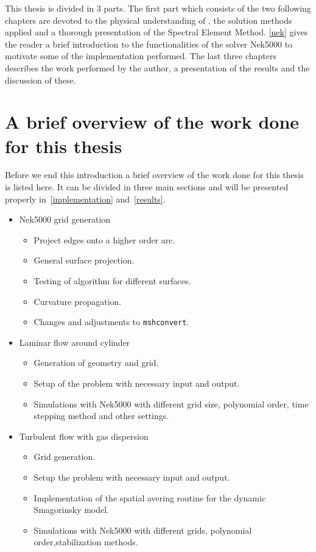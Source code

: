 This thesis is divided in 3 parts. The first part which consists of the two following chapters are devoted to the physical understanding 
of , the solution methods applied and a thorough presentation of the Spectral Element Method. \cref{nek} gives the reader a brief 
introduction to the functionalities of the solver Nek5000 to motivate some of the implementation performed. The last three chapters 
describes the work performed by the author, a presentation of the results and the discussion of these.

\section{A brief overview of the work done for this thesis}

Before we end this introduction a brief overview of the work done for this thesis is listed here. 
It can be divided in three main sections and will be presented properly in~\cref{implementation}
and~\ref{results}. 

\begin{itemize}
    \item Nek5000 grid generation
        \begin{itemize}
            \item Project edges onto a higher order arc.
            \item General surface projection.
            \item Testing of algorithm for different surfaces.
            \item Curvature propagation.
            \item Changes and adjustments to \verb|mshconvert|.
        \end{itemize}
    \item Laminar flow around cylinder
        \begin{itemize}
            \item Generation of geometry and grid.
            \item Setup of the problem with necessary input and output.
            \item Simulations with Nek5000 with different grid size, polynomial order, time stepping method and other settings.
        \end{itemize}
    \item Turbulent flow with gas dispersion
        \begin{itemize}
            \item Grid generation.
            \item Setup the problem with necessary input and output.
            \item Implementation of the spatial avering routine for the dynamic Smagorinsky model.
            \item Simulations with Nek5000 with different grids, polynomial order,stabilization methods.
        \end{itemize}
\end{itemize}

